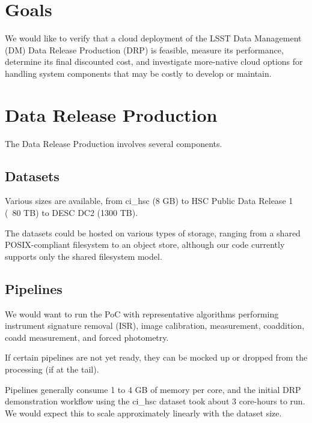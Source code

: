 \section{Goals} \label{sec:goals}
We would like to verify that a cloud deployment of the LSST Data Management (DM) Data Release Production (DRP) is feasible, measure its performance, determine its final discounted cost, and investigate more-native cloud options for handling system components that may be costly to develop or maintain.

\section{Data Release Production} \label{sec:drp}
The Data Release Production involves several components.

\subsection{Datasets} \label{sec:drp-datasets}
Various sizes are available, from ci\_hsc (8 GB) to HSC Public Data Release 1 (~80 TB) to DESC DC2 (1300 TB).

The datasets could be hosted on various types of storage, ranging from a shared POSIX-compliant filesystem to an object store, although our code currently supports only the shared filesystem model.

\subsection{Pipelines} \label{sec:drp-pipelines}
We would want to run the PoC with representative algorithms performing instrument signature removal (ISR), image calibration, measurement, coaddition, coadd measurement, and forced photometry.

If certain pipelines are not yet ready, they can be mocked up or dropped from the processing (if at the tail).

Pipelines generally consume 1 to 4 GB of memory per core, and the initial DRP demonstration workflow using the ci\_hsc dataset took about 3 core-hours to run. We would expect this to scale approximately linearly with the dataset size.

